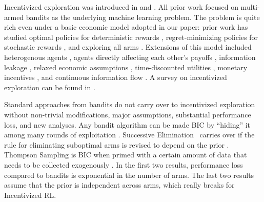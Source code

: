 Incentivized exploration was introduced in \citet{Kremer-JPE14} and \citet{Che-13}. All prior work focused on multi-armed bandits as the underlying machine learning problem. The problem is quite rich even under a basic economic model adopted in our paper: prior work has studied
optimal policies for deterministic rewards \citep{Kremer-JPE14,Cohen-Mansour-ec19},
regret-minimizing policies for stochastic rewards \citep{ICexploration-ec15}, and
exploring all arms \citep{ICexploration-ec15,ICexplorationGames-ec16}. Extensions of this model included
heterogenous agents \citep{Jieming-multitypes18,Kempe-colt18},
agents directly affecting each other's payoffs 
\citep{ICexplorationGames-ec16},
information leakage \citep{Bahar-ec16,Bahar-ec19},
relaxed economic assumptions
\citep{Jieming-unbiased18}, time-discounted utilities \citep{Bimpikis-exploration-ms17}, monetary incentives \citep{Frazier-ec14,Kempe-colt18}, and continuous information flow \citep{Che-13}. A survey on incentivized exploration can be found in
\citep[][Ch. 11]{slivkins-MABbook}. %

Standard approaches from bandits do not carry over to incentivized exploration without non-trivial modifications, major assumptions, substantial performance loss, and new analyses. Any bandit algorithm can be made BIC by ``hiding'' it among many rounds of exploitation \citep{ICexploration-ec15}.
Successive Elimination~\citep{EvenDar-icml06} carries over if the rule for eliminating suboptimal arms is revised to depend on the prior \citep{ICexploration-ec15}.
Thompson Sampling is BIC when primed with a certain amount of data that needs to be collected exogenously \citep{Selke-PoIE-ec21}. In the first two results, performance loss compared to bandits is exponential in the number of arms. The last two results assume that the prior is independent across arms, which really breaks for Incentivized RL.


